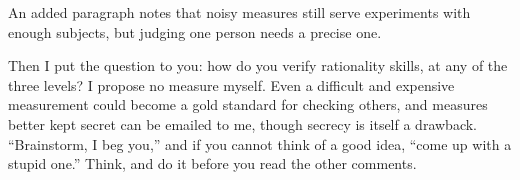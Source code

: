 An added paragraph notes that noisy measures still serve experiments with enough subjects, but judging one person needs a precise one.

Then I put the question to you: how do you verify rationality skills, at any of the three levels? I propose no measure myself. Even a difficult and expensive measurement could become a gold standard for checking others, and measures better kept secret can be emailed to me, though secrecy is itself a drawback. ``Brainstorm, I beg you,'' and if you cannot think of a good idea, ``come up with a stupid one.'' Think, and do it before you read the other comments. 
